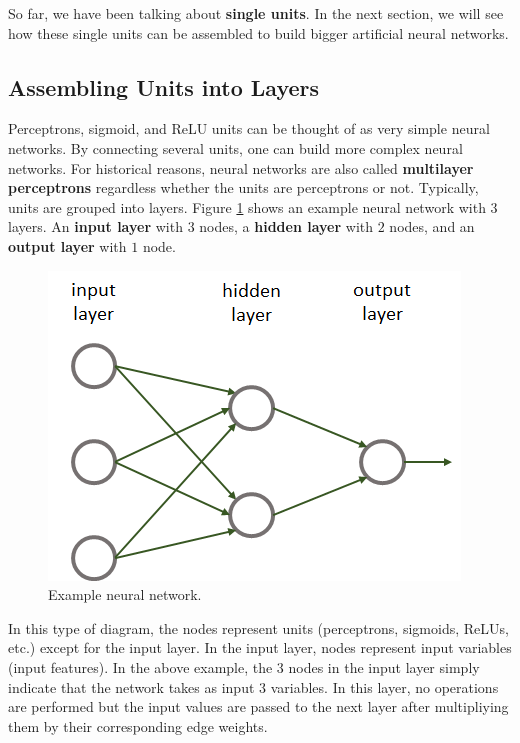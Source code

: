 \documentclass[
  11pt,
]{krantz}
\makeatletter
\newenvironment{kframe}{%
\medskip{}
\setlength{\fboxsep}{.8em}
 \def\at@end@of@kframe{}%
 \ifinner\ifhmode%
  \def\at@end@of@kframe{\end{minipage}}%
  \begin{minipage}{\columnwidth}%
 \fi\fi%
 \def\FrameCommand##1{\hskip\@totalleftmargin \hskip-\fboxsep
 \colorbox{shadecolor}{##1}\hskip-\fboxsep
     \hskip-\linewidth \hskip-\@totalleftmargin \hskip\columnwidth}%
 \MakeFramed {\advance\hsize-\width
   \@totalleftmargin\z@ \linewidth\hsize
   \@setminipage}}%
 {\par\unskip\endMakeFramed%
 \at@end@of@kframe}
\newenvironment{rmdblock}[1]
  {
  \begin{itemize}
  \renewcommand{\labelitemi}{
    \raisebox{-.7\height}[0pt][0pt]{
      {\setkeys{Gin}{width=3em,keepaspectratio}\texttt{[image: images/icons/\#1]}}
    }
  }
  \setlength{\fboxsep}{1em}
  \begin{kframe}
  \item
  }
  {
  \end{kframe}
  \end{itemize}
  }
\newenvironment{rmdcaution}
  {\begin{rmdblock}{caution}}
  {\end{rmdblock}}
\makeatother
\begin{document}
So far, we have been talking about \textbf{single units}. In the next section, we will see how these single units can be assembled to build bigger artificial neural networks.

\hypertarget{assembling-units-into-layers}{%
\subsection{Assembling Units into Layers}\label{assembling-units-into-layers}}

Perceptrons, sigmoid, and ReLU units can be thought of as very simple neural networks. By connecting several units, one can build more complex neural networks. For historical reasons, neural networks are also called \textbf{multilayer perceptrons} regardless whether the units are perceptrons or not. Typically, units are grouped into layers. Figure \ref{fig:nnExampleNN} shows an example neural network with \(3\) layers. An \textbf{input layer} with \(3\) nodes, a \textbf{hidden layer} with \(2\) nodes, and an \textbf{output layer} with \(1\) node.

\begin{figure}

{\centering \includegraphics[width=0.5\linewidth]{images/nn_example_nn} 

}

\caption{Example neural network.}\label{fig:nnExampleNN}
\end{figure}

\begin{rmdcaution}
In this type of diagram, the nodes represent units (perceptrons, sigmoids, ReLUs, etc.) except for the input layer. In the input layer, nodes represent input variables (input features). In the above example, the \(3\) nodes in the input layer simply indicate that the network takes as input \(3\) variables. In this layer, no operations are performed but the input values are passed to the next layer after multipliying them by their corresponding edge weights.
\end{rmdcaution}
\end{document}
